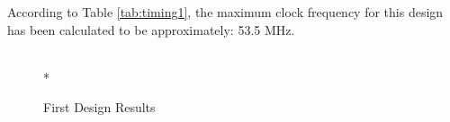 According to Table \ref{tab:timing1}, the maximum clock frequency for this design has been calculated to be approximately: 53.5 MHz.

\begin{figure}[htp]
  \begin{center}
     \\*
  \end{center}
  \caption{First Design Results}
  \label{fig:design1_results}
\end{figure}

